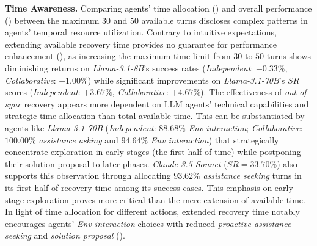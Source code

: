 \begin{table}[!h]
\begin{center}
\begin{small}
\begin{tabular}
    \bottomrule
    
    \end{tabular}
\end{small}
\end{center}
\end{table}








\textbf{Time Awareness.} Comparing agents' time allocation () and overall performance () between the maximum $30$ and $50$ available turns discloses complex patterns in agents' temporal resource utilization. Contrary to intuitive expectations, extending available recovery time provides no guarantee for performance enhancement (), as increasing the maximum time limit from $30$ to $50$ turns shows diminishing returns on \textit{Llama-3.1-8B}'s success rates (\textit{Independent}: $-0.33\%$, \textit{Collaborative}: $-1.00\%$) while significant improvements on \textit{Llama-3.1-70B}'s $SR$ scores (\textit{Independent}: $+3.67\%$, \textit{Collaborative}: $+4.67\%$). The effectiveness of \textit{out-of-sync} recovery appears more dependent on LLM agents' technical capabilities and strategic time allocation than total available time. This can be substantiated by agents like \textit{Llama-3.1-70B} (\textit{Independent}: $88.68\%$ \textcolor{fig2_env}{\textit{Env interaction}}; \textit{Collaborative}: $100.00\%$ \textcolor{fig2_ask}{\textit{assistance asking}} and $94.64\%$ \textcolor{fig2_env}{\textit{Env interaction}}) that strategically concentrate exploration in early stages (the first half of time) while postponing their \textcolor{fig2_ask}{solution proposal} to later phases.
\textit{Claude-3.5-Sonnet} ($SR=33.70\%$) also supports this observation through allocating $93.62\%$ \textcolor{fig2_ask}{\textit{assistance seeking}} turns in its first half of recovery time among its success cases. This emphasis on early-stage exploration proves more critical than the mere extension of available time.
In light of time allocation for different actions, extended recovery time notably encourages agents' \textcolor{fig2_env}{\textit{Env interaction}} choices with reduced \textcolor{fig2_ask}{\textit{proactive assistance seeking}} and \textcolor{fig2_code}{\textit{solution proposal}} ().
